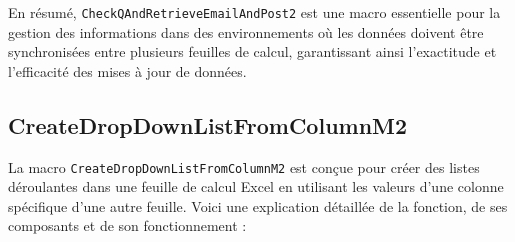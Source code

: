 \documentclass[a4paper, oneside, 12pt, final]{extreport}
\begin{document}
En résumé, \texttt{CheckQAndRetrieveEmailAndPost2} est une macro essentielle pour la gestion des informations dans des environnements où les données doivent être synchronisées entre plusieurs feuilles de calcul, garantissant ainsi l'exactitude et l'efficacité des mises à jour de données.
\subsection{CreateDropDownListFromColumnM2}

La macro \texttt{CreateDropDownListFromColumnM2} est conçue pour créer des listes déroulantes dans une feuille de calcul Excel en utilisant les valeurs d'une colonne spécifique d'une autre feuille. Voici une explication détaillée de la fonction, de ses composants et de son fonctionnement :
\end{document}
